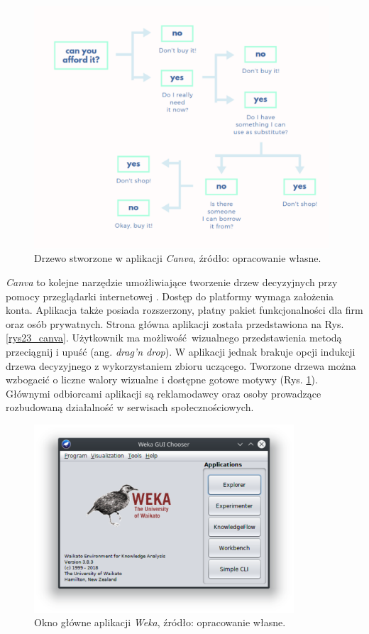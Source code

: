 \begin{figure}[htb]
	\centering
	\includegraphics[width=11cm]{grafika/canvas_tree.eps}
	\caption{Drzewo stworzone w aplikacji \textit{Canva}, źródło: opracowanie własne.}
	\label{rys24_canva_tree}
\end{figure}

\textit{Canva} to kolejne narzędzie umożliwiające tworzenie drzew decyzyjnych przy pomocy przeglądarki internetowej \cite{misc_canva}. Dostęp do platformy wymaga założenia konta. Aplikacja także posiada rozszerzony, płatny pakiet funkcjonalności dla firm oraz osób prywatnych. Strona główna aplikacji została przedstawiona na Rys. \ref{rys23_canva}. Użytkownik ma możliwość wizualnego przedstawienia metodą przeciągnij i upuść (ang. \textit{drag'n drop}). W aplikacji jednak brakuje opcji indukcji drzewa decyzyjnego z wykorzystaniem zbioru uczącego. Tworzone drzewa można wzbogacić o liczne walory wizualne i dostępne gotowe motywy (Rys. \ref{rys24_canva_tree}). Głównymi odbiorcami aplikacji są reklamodawcy oraz osoby prowadzące rozbudowaną działalność w serwisach społecznościowych. 
 
\begin{figure}[htb]
	\centering
	\includegraphics[height=7cm]{grafika/weka.eps}
	\caption{Okno główne aplikacji \textit{Weka}, źródło: opracowanie własne.}
	\label{rys25_weka}
\end{figure}

